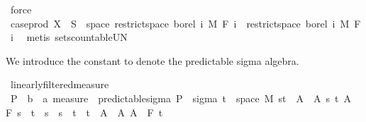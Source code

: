 \begin{isabellebody}
\ force\ \ \isanewline
\ \ \isamarkupfalse%
\ \isamarkupfalse%
\ {\isachardoublequoteopen}case{\isacharunderscore}{\kern0pt}prod\ X\ {\isacharminus}{\kern0pt}{\isacharbackquote}{\kern0pt}\ S\ {\isasyminter}\ space\ {\isacharparenleft}{\kern0pt}restrict{\isacharunderscore}{\kern0pt}space\ borel\ {\isacharbraceleft}{\kern0pt}{}{\isachardot}{\kern0pt}{\isachardot}{\kern0pt}i{\isacharbraceright}{\kern0pt}\ {\isasymOtimes}\isactrlsub M\ F\ i{\isacharparenright}{\kern0pt}\ {\isasymin}\ restrict{\isacharunderscore}{\kern0pt}space\ borel\ {\isacharbraceleft}{\kern0pt}{}{\isachardot}{\kern0pt}{\isachardot}{\kern0pt}i{\isacharbraceright}{\kern0pt}\ {\isasymOtimes}\isactrlsub M\ F\ i{\isachardoublequoteclose}\ \isamarkupfalse%
\ {\isacharparenleft}{\kern0pt}metis\ sets{\isachardot}{\kern0pt}countable{\isacharunderscore}{\kern0pt}UN{\isacharparenright}{\kern0pt}\isanewline
{}\isamarkupfalse%
%
\endisatagproof
{\isafoldproof}%
%
\isadelimproof
%
\endisadelimproof
%
\isadelimdocument
%
\endisadelimdocument
%
\isatagdocument
%
\isamarkuptrue%
%
\endisatagdocument
{\isafolddocument}%
%
\isadelimdocument
%
\endisadelimdocument
%
\begin{isamarkuptext}%
We introduce the constant  to denote the predictable sigma algebra.%
\end{isamarkuptext}\isamarkuptrue%
\isamarkupfalse%
\ linearly{\isacharunderscore}{\kern0pt}filtered{\isacharunderscore}{\kern0pt}measure\isanewline
{}\isanewline
\isanewline
{}\isamarkupfalse%
\ {\isasymSigma}\isactrlsub P\ {\isacharcolon}{\kern0pt}{\isacharcolon}{\kern0pt}\ {\isachardoublequoteopen}{\isacharparenleft}{\kern0pt}{\isacharprime}{\kern0pt}b\ {\isasymtimes}\ {\isacharprime}{\kern0pt}a{\isacharparenright}{\kern0pt}\ measure{\isachardoublequoteclose}\ \ predictable{\isacharunderscore}{\kern0pt}sigma{\isacharcolon}{\kern0pt}\ {\isachardoublequoteopen}{\isasymSigma}\isactrlsub P\ {\isasymequiv}\ sigma\ {\isacharparenleft}{\kern0pt}{\isacharbraceleft}{\kern0pt}t\ {\isasymtimes}\ space\ M{\isacharparenright}{\kern0pt}\ {\isacharparenleft}{\kern0pt}{\isacharbraceleft}{\kern0pt}{\isacharbraceleft}{\kern0pt}s{\isacharless}{\kern0pt}{\isachardot}{\kern0pt}{\isachardot}{\kern0pt}t{\isacharbraceright}{\kern0pt}\ {\isasymtimes}\ A\ {\isacharbar}{\kern0pt}\ A\ s\ t{\isachardot}{\kern0pt}\ A\ {\isasymin}\ F\ s\ {\isasymand}\ t\ {\isasymle}\ s\ {\isasymand}\ s\ {\isacharless}{\kern0pt}\ t{\isacharbraceright}{\kern0pt}\ {\isasymunion}\ {\isacharbraceleft}{\kern0pt}{\isacharbraceleft}{\kern0pt}t\ {\isasymtimes}\ A\ {\isacharbar}{\kern0pt}\ A{\isachardot}{\kern0pt}\ A\ {\isasymin}\ F\ t\isanewline

\end{isabellebody}
